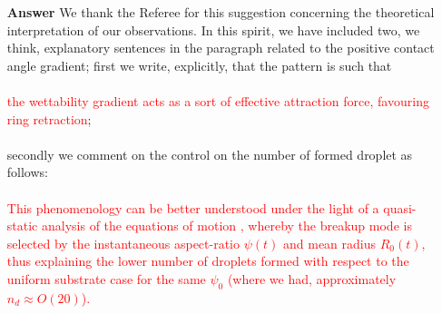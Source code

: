 \documentclass[12pt,english]{article}
\begin{document}
\begin{itemize}
\item[ \textbf{{Answer}}]
{
We thank the Referee for this suggestion concerning the theoretical 
interpretation of our observations. In this spirit, we have included two, we think, explanatory sentences in the paragraph related to the positive contact angle gradient; first we write, explicitly, that the pattern is such that\\
\\
\textcolor{red}{the wettability gradient acts as a sort of effective attraction force, favouring ring retraction};\\
\\
secondly we comment on the control on the number of formed droplet
as follows:\\
\\
\textcolor{red}{This phenomenology can be better understood under the light of a quasi-static analysis of the equations of motion \cite{gonzalezStabilityLiquidRing2013}, whereby the breakup mode is selected 
by the instantaneous aspect-ratio $\psi(t)$ and mean radius $R_0(t)$, thus 
explaining the lower number of droplets formed with respect to the uniform 
substrate case for the same $\psi_0$ (where we had, approximately $n_d \approx O(20)$).}
}
\end{itemize}




\end{document}
